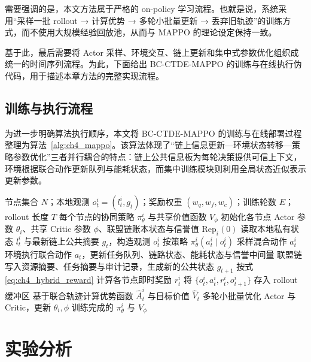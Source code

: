 需要强调的是，本文方法属于严格的 on-policy 学习流程。也就是说，系统采用“采样一批 rollout → 计算优势 → 多轮小批量更新 → 丢弃旧轨迹”的训练方式，而不使用大规模经验回放池，从而与 MAPPO 的理论设定保持一致。

基于此，最后需要将 Actor 采样、环境交互、链上更新和集中式参数优化组织成统一的时间序列流程。为此，下面给出 BC-CTDE-MAPPO 的训练与在线执行伪代码，用于描述本章方法的完整实现流程。

\subsection{训练与执行流程}

为进一步明确算法执行顺序，本文将 BC-CTDE-MAPPO 的训练与在线部署过程整理为算法~\ref{alg:ch4_mappo}。该算法体现了“链上信息更新—环境状态转移—策略参数优化”三者并行耦合的特点：链上公共信息板为每轮决策提供可信上下文，环境根据联合动作更新队列与能耗状态，而集中训练模块则利用全局状态近似表示更新参数。

\begin{algorithm}[htbp]
    \caption{BC-CTDE-MAPPO 协同资源分配算法}
    \label{alg:ch4_mappo}
    \begin{algorithmic}[1]
        \Require 节点集合 $N$；本地观测 $o_t^i=(l_t^i,g_t)$；奖励权重 $(w_q,w_f,w_c)$；训练轮数 $E$；rollout 长度 $T$
        \Ensure 每个节点的协同策略 $\pi_\theta^i$ 与共享价值函数 $V_\phi$
        \State 初始化各节点 Actor 参数 $\theta_i$、共享 Critic 参数 $\phi$、联盟链账本状态与信誉值 $\mathrm{Rep}_i(0)$
        \State 读取本地私有状态 $l_t^i$ 与最新链上公共摘要 $g_t$，构造观测 $o_t^i$
        \State 按策略 $\pi_\theta^i(a_t^i\mid o_t^i)$ 采样混合动作 $a_t^i$
        \EndFor
        \State 环境执行联合动作 $a_t$，更新任务队列、链路状态、能耗状态与信誉中间量
        \State 联盟链写入资源摘要、任务摘要与审计记录，生成新的公共状态 $g_{t+1}$
        \State 按式\eqref{eq:ch4_hybrid_reward} 计算各节点即时奖励 $r_t^i$
        \State 将 $\{o_t^i,a_t^i,r_t^i,o_{t+1}^i\}$ 存入 rollout 缓冲区
        \EndFor
        \State 基于联合轨迹计算优势函数 $\hat{A}_t^i$ 与目标价值 $\hat{V}_t$
        \State 多轮小批量优化 Actor 与 Critic，更新 $\theta_i,\phi$
        \EndFor
        \State \Return 训练完成的 $\pi_\theta^i$ 与 $V_\phi$
    \end{algorithmic}
\end{algorithm}

\section{实验分析}

